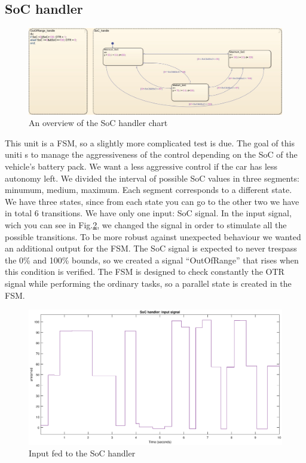 \documentclass[12pt,a4paper]{report}
\begin{document}
\subsection{SoC handler}
\begin{figure}[!h]
	\centering
	\includegraphics[scale=0.34]{SoC_handle_subs.jpg}
	\caption{An overview of the SoC handler chart}
	\label{SoC_handle_subs}
\end{figure}
\FloatBarrier
This unit is a FSM, so a slightly more complicated test is due. The goal of this uniti s to manage the aggressiveness of the control depending on the SoC of the vehicle’s battery pack. We want a less aggressive control if the car has less autonomy left. We divided the interval of possible SoC values in three segments: minumum, medium, maximum. Each segment corresponds to a different state. We have three states, since from each state you can go to the other two we have in total 6 transitions.  We have only one input: SoC signal. In the input signal, wich you can see in Fig.\ref{SoC_handle_input}, we changed the signal in order to stimulate all the possible transitions. 
To be more robust against unexpected behaviour we wanted an additional output for the FSM. The SoC signal is expected to never trespass the 0\% and 100\% bounds, so we created a signal “OutOfRange” that rises when this condition is verified. The FSM is designed to check constantly the OTR signal while performing the ordinary tasks, so a parallel state is created in the FSM.
\begin{figure}[!h]
	\centering
	\includegraphics[scale=0.34]{SoC_handle_input.eps}
	\caption{Input fed to the SoC handler }
	\label{SoC_handle_input}
\end{figure}
\end{document}
